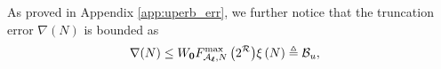 \documentclass[12pt,onecolumn,draftcls]{IEEEtran}
\newcommand{\bs}{\boldsymbol}
\begin{document}
As proved in Appendix \ref{app:uperb_err}, we further notice that the truncation error $\nabla(N)$ is bounded as %
\begin{align}\label{eqn:trun_err_fina_hyp}
\nabla(N)  %
 &\le  {W_{\bf{0}}}{{F_{{ {\cal A}_{\bs{\ell}}},N}^{\rm max}}\left( 2^{\cal R} \right)} \xi \left( N \right) \triangleq \mathcal B_u, %
\end{align}
\end{document}
